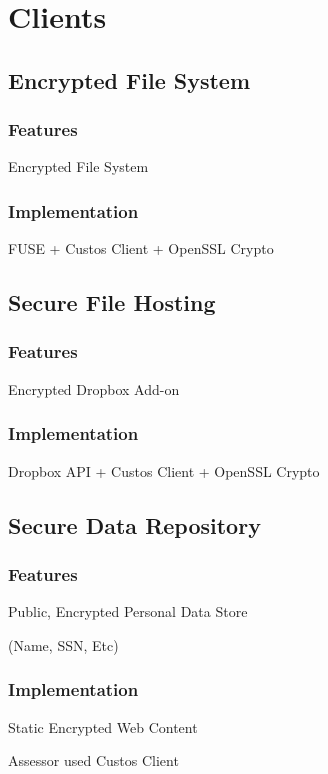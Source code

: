 \chapter{Clients}
\label{chap:clients}

\section{Encrypted File System}

\subsection{Features}

Encrypted File System

\subsection{Implementation}

FUSE + Custos Client + OpenSSL Crypto

\section{Secure File Hosting}

\subsection{Features}

Encrypted Dropbox Add-on

\subsection{Implementation}

Dropbox API + Custos Client + OpenSSL Crypto

\section{Secure Data Repository}

\subsection{Features}

Public, Encrypted Personal Data Store

(Name, SSN, Etc)

\subsection{Implementation}

Static Encrypted Web Content

Assessor used Custos Client
